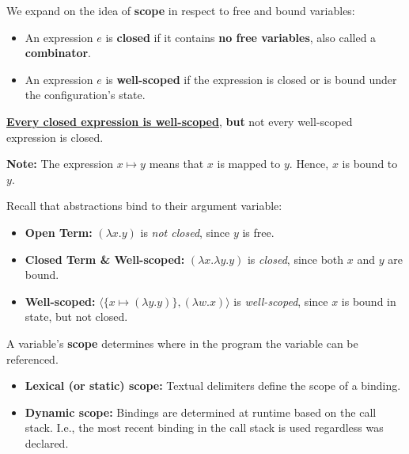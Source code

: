     
\begin{Def}

    \label{def:well-scopedness}

    We expand on the idea of \textbf{scope} in respect to free and bound variables: 

    \begin{itemize}
        
        \item 
        An expression \( e \) is \textbf{closed} if it contains \textbf{no free variables}, also called a \textbf{combinator}.
        \item 
        An expression \( e \) is \textbf{well-scoped} if the expression is closed or is bound under the configuration's state.
    \end{itemize}
    \noindent
    \underline{\textbf{Every closed expression is well-scoped}}, \textbf{but} not every well-scoped expression is closed.
\end{Def}

\begin{Note}
\textbf{Note:} The expression $x\mapsto y$ means that $x$ is mapped to $y$. Hence, $x$ is bound to $y$.
\end{Note}
\begin{Example}
    
    \label{ex:closed-terms}
    Recall that abstractions bind to their argument variable:
    \begin{itemize}
        \item \textbf{Open Term:} \((\lambda x. y)\) is \emph{not closed}, since \(y\) is free.
        \item \textbf{Closed Term \& Well-scoped:} \((\lambda x. \lambda y. y)\) is \emph{closed}, since both \(x\) and \(y\) are bound.
        \item \textbf{Well-scoped:} $\langle \{x\mapsto (\lambda y. y)\}, (\lambda w.x)\rangle$ is \emph{well-scoped}, since \(x\) is bound in state, but not closed.
    \end{itemize}

\end{Example}

\begin{Def}

    \label{def:scope}

    \noindent
    A variable's \textbf{scope} determines where in the program the variable can be referenced.

    \begin{itemize}
        \item \textbf{Lexical (or static) scope:} Textual delimiters define the scope of a binding.
        
        \item \textbf{Dynamic scope:} Bindings are determined at runtime based on the call stack. I.e., the most recent binding in the call stack is used regardless 
        was declared.
    \end{itemize}
\end{Def}

